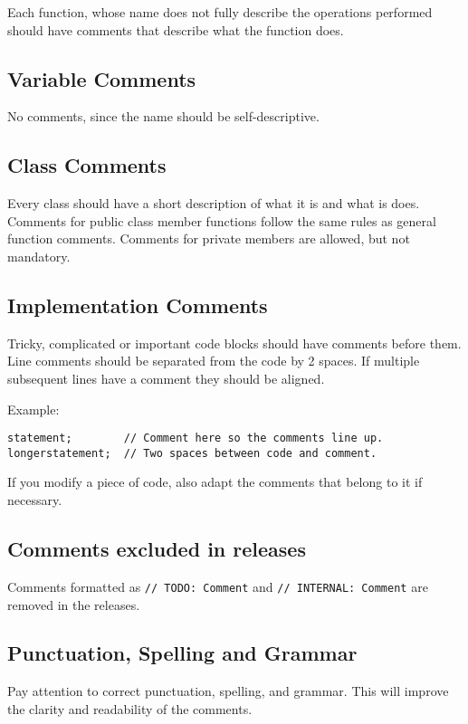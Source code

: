 \documentclass[a4paper]{article}
\newcommand{\inlinecode}[1]{\lstinline|#1|}
\begin{document}
Each function, whose name does not fully describe the operations performed should have comments that describe what the function does.

\subsection{Variable Comments}

No comments, since the name should be self-descriptive.

\subsection{Class Comments}

Every class should have a short description of what it is and what is does.
Comments for public class member functions follow the same rules as general function comments.
Comments for private members are allowed, but not mandatory.

\subsection{Implementation Comments}

Tricky, complicated or important code blocks should have comments before them.
Line comments should be separated from the code by 2 spaces. If multiple subsequent lines have a comment they should be aligned.

Example:
\begin{lstlisting}
statement;        // Comment here so the comments line up.
longerstatement;  // Two spaces between code and comment.
\end{lstlisting}

If you modify a piece of code, also adapt the comments that belong to it if necessary.

\subsection{Comments excluded in releases}

Comments formatted as \inlinecode{// TODO: Comment} and \inlinecode{// INTERNAL: Comment} are removed in the releases.

\subsection{Punctuation, Spelling and Grammar}

Pay attention to correct punctuation, spelling, and grammar. This will improve the clarity and readability of the comments.
\end{document}
